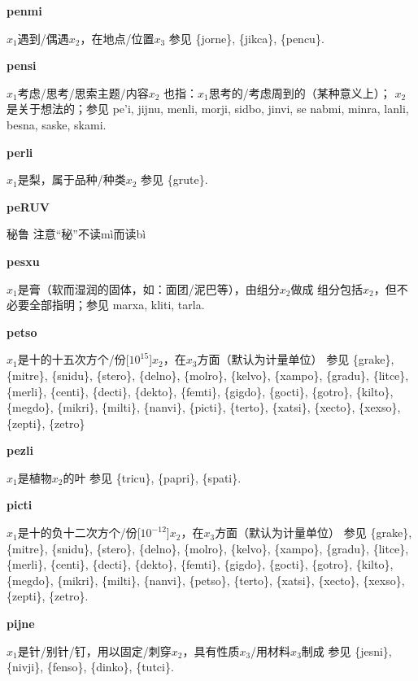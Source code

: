 \documentclass[notitlepage,twocolumn,a4paper,10pt]{book}
\begin{document}
{\sffamily\bfseries penmi}\enspace {\ttfamily\bfseries[pen     pe'i]}  $x_1$遇到\slash{}偶遇$x_2$，在地点\slash{}位置$x_3$ \textemdash{} 参见 \{jorne\}, \{jikca\}, \{pencu\}.

{\sffamily\bfseries pensi}  $x_1$考虑\slash{}思考\slash{}思索主题\slash{}内容$x_2$ \textemdash{} 也指：$x_1$思考的\slash{}考虑周到的（某种意义上）； $x_2$ 是关于想法的；参见 {pe'i}, {jijnu}, {menli}, {morji}, {sidbo}, {jinvi}, se {nabmi}, {minra}, {lanli}, {besna}, {saske}, {skami}.

{\sffamily\bfseries perli}\enspace {\ttfamily\bfseries[per]}  $x_1$是梨，属于品种\slash{}种类$x_2$ \textemdash{} 参见 \{grute\}.

{\sffamily\bfseries peRUV} 秘鲁 \textemdash{} 注意“秘”不读mì而读bì

{\sffamily\bfseries pesxu}\enspace {\ttfamily\bfseries[pex]}  $x_1$是膏（软而湿润的固体，如：面团\slash{}泥巴等），由组分$x_2$做成 \textemdash{} 组分包括$x_2$，但不必要全部指明；参见 {marxa}, {kliti}, {tarla}.

{\sffamily\bfseries petso}\enspace {\ttfamily\bfseries[pet]}  $x_1$是十的十五次方个\slash{}份[$10^{15}$]$x_2$，在$x_3$方面（默认为计量单位） \textemdash{} 参见 \{grake\}, \{mitre\}, \{snidu\}, \{stero\}, \{delno\}, \{molro\}, \{kelvo\}, \{xampo\}, \{gradu\}, \{litce\}, \{merli\}, \{centi\}, \{decti\}, \{dekto\}, \{femti\}, \{gigdo\}, \{gocti\}, \{gotro\}, \{kilto\}, \{megdo\}, \{mikri\}, \{milti\}, \{nanvi\}, \{picti\}, \{terto\}, \{xatsi\}, \{xecto\}, \{xexso\}, \{zepti\}, \{zetro\}

{\sffamily\bfseries pezli}\enspace {\ttfamily\bfseries[pez]}  $x_1$是植物$x_2$的叶 \textemdash{} 参见 \{tricu\}, \{papri\}, \{spati\}.

{\sffamily\bfseries picti}\enspace {\ttfamily\bfseries[pic]}  $x_1$是十的负十二次方个\slash{}份[$10^{-12}$]$x_2$，在$x_3$方面（默认为计量单位） \textemdash{} 参见 \{grake\}, \{mitre\}, \{snidu\}, \{stero\}, \{delno\}, \{molro\}, \{kelvo\}, \{xampo\}, \{gradu\}, \{litce\}, \{merli\}, \{centi\}, \{decti\}, \{dekto\}, \{femti\}, \{gigdo\}, \{gocti\}, \{gotro\}, \{kilto\}, \{megdo\}, \{mikri\}, \{milti\}, \{nanvi\}, \{petso\}, \{terto\}, \{xatsi\}, \{xecto\}, \{xexso\}, \{zepti\}, \{zetro\}.

{\sffamily\bfseries pijne} $x_1$是针\slash{}别针\slash{}钉，用以固定\slash{}刺穿$x_2$，具有性质$x_3$\slash{}用材料$x_3$制成 \textemdash{} 参见 \{jesni\}, \{nivji\}, \{fenso\}, \{dinko\}, \{tutci\}.
\end{document}
